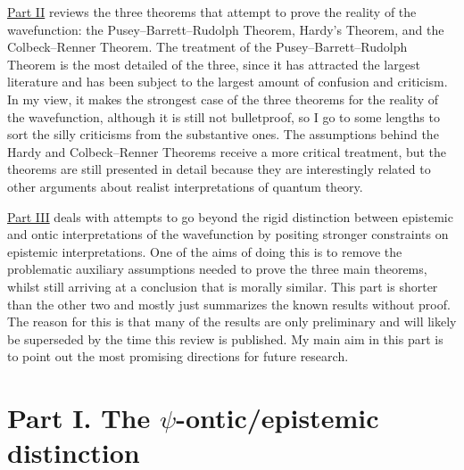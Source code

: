 \documentclass[DIV=calc,paper=a4,fontsize=11pt,twocolumn]{scrartcl} %
\theoremstyle{definition}
\theoremstyle{plain}
\begin{document}
\hyperref[SPON]{Part II} reviews the three theorems that attempt to prove the
reality of the wavefunction: the Pusey--Barrett--Rudolph Theorem, Hardy's Theorem, and the
Colbeck--Renner Theorem.  The treatment of the Pusey--Barrett--Rudolph Theorem is the most
detailed of the three, since it has attracted the largest literature
and has been subject to the largest amount of confusion and criticism.
In my view, it makes the strongest case of the three theorems for the
reality of the wavefunction, although it is still not bulletproof, so
I go to some lengths to sort the silly criticisms from the substantive
ones.  The assumptions behind the Hardy and Colbeck--Renner Theorems
receive a more critical treatment, but the theorems are still
presented in detail because they are interestingly related to other
arguments about realist interpretations of quantum theory.

\hyperref[Beyond]{Part III} deals with attempts to go beyond the rigid
distinction between epistemic and ontic interpretations of the
wavefunction by positing stronger constraints on epistemic
interpretations.  One of the aims of doing this is to remove the
problematic auxiliary assumptions needed to prove the three main
theorems, whilst still arriving at a conclusion that is morally
similar.  This part is shorter than the other two and mostly just
summarizes the known results without proof.  The reason for this is
that many of the results are only preliminary and will likely be
superseded by the time this review is published.  My main aim in this
part is to point out the most promising directions for future
research.

\section*{Part I. The $\psi$-ontic/epistemic distinction\label{OED}}
\end{document}
